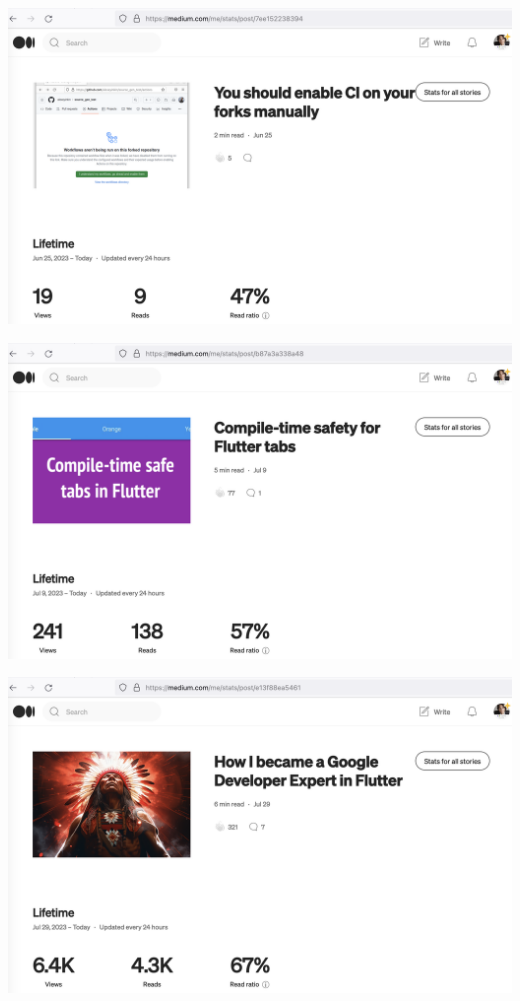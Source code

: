\begin{center}
    \includegraphics[width=\textwidth]{2023-06-25_forks}
\end{center}

\begin{center}
    \includegraphics[width=\textwidth]{2023-07-09_tabs}
\end{center}

\begin{center}
    \includegraphics[width=\textwidth]{2023-07-29_gde}
\end{center}

